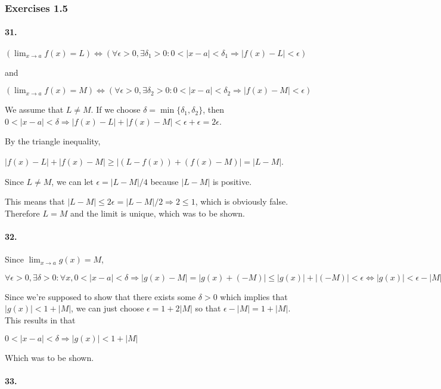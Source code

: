 \subsubsection{Exercises 1.5}

\paragraph{31.}

$(\lim_{x\rightarrow a} f(x) = L) \Leftrightarrow (\forall \epsilon > 0, \exists \delta_1 > 0 : 0<|x-a|<\delta_1 \Rightarrow |f(x)-L|<\epsilon)$

and 

$(\lim_{x\rightarrow a} f(x) = M) \Leftrightarrow (\forall \epsilon > 0, \exists \delta_2 > 0 : 0<|x-a|<\delta_2 \Rightarrow |f(x)-M|<\epsilon)$

We assume that $L \neq M$. If we choose $\delta = \min\{\delta_1, \delta_2\}$, then $0<|x-a|<\delta \Rightarrow |f(x)-L| + |f(x)-M| < \epsilon + \epsilon = 2\epsilon$. 

By the triangle inequality,

$|f(x)-L| + |f(x)-M| \geq |(L-f(x)) + (f(x)-M)| = |L-M|$.

Since $L \neq M$, we can let $\epsilon = |L-M|/4$ because $|L-M|$ is positive.

This means that $|L-M| \leq 2\epsilon = |L-M|/2 \Rightarrow 2 \leq 1$, which is obviously false. Therefore $L = M$ and the limit is unique, which was to be shown.

\newpage
\paragraph{32.}

Since $\lim_{x\rightarrow a} g(x) = M$,

$\forall \epsilon > 0, \exists \delta > 0 : \forall x, 0<|x-a|<\delta \Rightarrow |g(x)-M|=|g(x)+(-M)| \leq |g(x)|+|(-M)|<\epsilon \Leftrightarrow |g(x)| < \epsilon - |M|$

Since we're supposed to show that there exists some $\delta > 0$ which implies that $|g(x)| < 1 + |M|$, we can just choose $\epsilon = 1 + 2|M|$ so that $\epsilon - |M| = 1 + |M|$. This results in that

$0<|x-a|<\delta \Rightarrow |g(x)| < 1 + |M|$

Which was to be shown.

\paragraph{33.}

